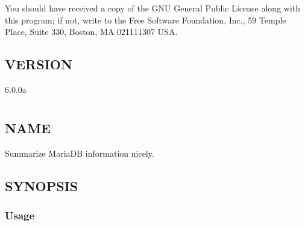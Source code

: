 \documentclass[letterpaper,10pt,english]{sphinxmanual}
\begin{document}
You should have received a copy of the GNU General Public License along with
this program; if not, write to the Free Software Foundation, Inc., 59 Temple
Place, Suite 330, Boston, MA  02111\sphinxhyphen{}1307  USA.


\section{VERSION}
\label{\detokenize{mariadb-archiver:version}}
 6.0.0a


\chapter{}
\label{\detokenize{mariadb-backup-manager:mariadb-backup-manager}}\label{\detokenize{mariadb-backup-manager::doc}}

\chapter{}
\label{\detokenize{mariadb-database-summary:mariadb-database-summary}}\label{\detokenize{mariadb-database-summary::doc}}

\section{NAME}
\label{\detokenize{mariadb-database-summary:name}}
 \sphinxhyphen{} Summarize MariaDB information nicely.


\section{SYNOPSIS}
\label{\detokenize{mariadb-database-summary:synopsis}}

\subsection{Usage}
\label{\detokenize{mariadb-database-summary:usage}}
\begin{sphinxVerbatim}[commandchars=\\\{\}]
 \PYG{p}{[}\PYG{p}{]}
\end{sphinxVerbatim}
\end{document}
